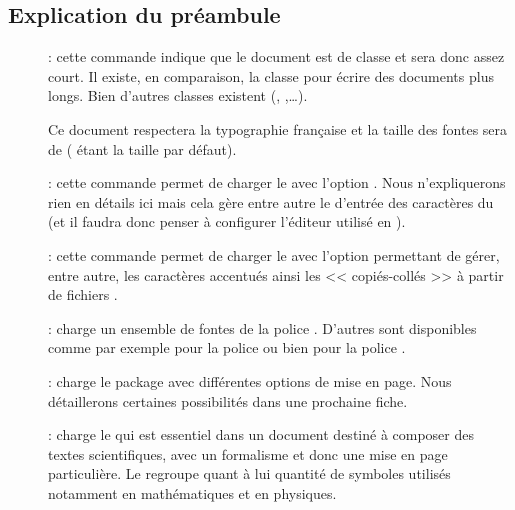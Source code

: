 \subsection{Explication du préambule}

\begin{description}
    \item[]  : cette commande indique que le document est de classe  et sera donc assez court. Il existe, en comparaison, la classe  pour écrire des documents plus longs. Bien d'autres classes existent (, ,\dots).\par
        Ce document respectera la typographie française et la taille des fontes sera de \OptPack{12pt} (\OptPack{10pt} étant la taille par défaut).

    \item[]  : cette commande permet de charger le   avec l'option . Nous n'expliquerons rien en détails ici mais cela gère entre autre le  d'entrée des caractères du  (et il faudra donc penser à configurer l'éditeur utilisé en ).

    \item[]  : cette commande permet de charger le   avec l'option  permettant de gérer, entre autre, les caractères accentués ainsi les << copiés-collés >> à partir de fichiers .

    \item[]  : charge un ensemble de fontes de la police . D'autres sont disponibles comme par exemple  pour la police  ou bien  pour la police .

    \item[]  : charge le package  avec différentes options de mise en page. Nous détaillerons certaines possibilités dans une prochaine fiche.

    \item[]  : charge le   qui est essentiel dans un document destiné à composer des textes scientifiques, avec un formalisme et donc une mise en page particulière. Le   regroupe quant à lui quantité de symboles utilisés notamment en mathématiques et en physiques.


\end{description}
